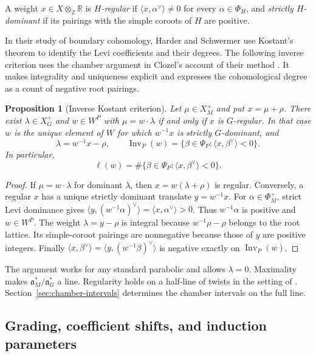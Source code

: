 \documentclass[12pt]{amsart}
\numberwithin{equation}{section}
\theoremstyle{plain}
\newtheorem{proposition}[theorem]{Proposition}
\theoremstyle{definition}
\theoremstyle{remark}
\DeclareMathOperator{\Inv}{Inv}
\begin{document}
A weight $x\in X\otimes_{\mathbb Z}\mathbb R$ is \emph{$H$-regular} if $\langle x,\alpha^\vee\rangle\ne0$ for every $\alpha\in\Phi_H$, and \emph{strictly $H$-dominant} if its pairings with the simple coroots of $H$ are positive.

In their study of boundary cohomology, Harder and Schwermer use Kostant's theorem to identify the Levi coefficients and their degrees. The following inverse criterion uses the chamber argument in Clozel's account of their method \cite[\S3.3, (3.5)--(3.6)]{Clozel2022}. It makes integrality and uniqueness explicit and expresses the cohomological degree as a count of negative root pairings.

\begin{proposition}[Inverse Kostant criterion]\label{prop:inverse-kostant}
Let $\mu\in X_M^+$ and put $x=\mu+\rho$. There exist $\lambda\in X_G^+$ and $w\in W^P$ with $\mu=w\cdot\lambda$ if and only if $x$ is $G$-regular. In that case $w$ is the unique element of $W$ for which $w^{-1}x$ is strictly $G$-dominant, and
\[
 \lambda=w^{-1}x-\rho,
 \qquad
 \Inv_P(w)=\{\beta\in\Psi_P:\langle x,\beta^\vee\rangle<0\}.
\]
In particular,
\begin{equation}\label{eq:length-sign}
 \ell(w)=\#\{\beta\in\Psi_P:\langle x,\beta^\vee\rangle<0\}.
\end{equation}
\end{proposition}

\begin{proof}
If $\mu=w\cdot\lambda$ for dominant $\lambda$, then $x=w(\lambda+\rho)$ is regular. Conversely, a regular $x$ has a unique strictly dominant translate $y=w^{-1}x$. For $\alpha\in\Phi_M^+$, strict Levi dominance gives $\langle y,(w^{-1}\alpha)^\vee\rangle=\langle x,\alpha^\vee\rangle>0$. Thus $w^{-1}\alpha$ is positive and $w\in W^P$. The weight $\lambda=y-\rho$ is integral because $w^{-1}\rho-\rho$ belongs to the root lattice. Its simple-coroot pairings are nonnegative because those of $y$ are positive integers. Finally $\langle x,\beta^\vee\rangle=\langle y,(w^{-1}\beta)^\vee\rangle$ is negative exactly on $\Inv_P(w)$.
\end{proof}

The argument works for any standard parabolic and allows $\lambda=0$. Maximality makes $\mathfrak a_M^*/\mathfrak a_G^*$ a line. Regularity holds on a half-line of twists in the setting of \cite[\S3.3, Theorem~3.6]{Clozel2022}. Section~\ref{sec:chamber-intervals} determines the chamber intervals on the full line.

\subsection{Grading, coefficient shifts, and induction parameters} \label{sec:grading-shifts}
\end{document}
